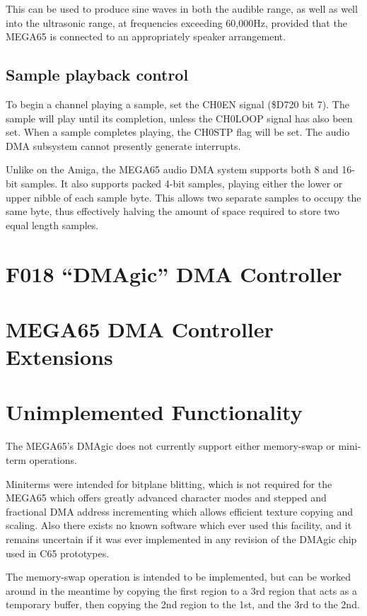 This can be used to produce sine waves in both the audible range, as
well as well into the ultrasonic range, at frequencies exceeding
60,000Hz, provided that the MEGA65 is connected to an appropriately
speaker arrangement.

\subsection{Sample playback control}

To begin a channel playing a sample, set the CH0EN signal (\$D720 bit
7). The sample will play until its completion, unless the CH0LOOP
signal has also been set. When a sample completes playing, the CH0STP
flag will be set.  The audio DMA subsystem cannot presently generate
interrupts.

Unlike on the Amiga\texttrademark{}, the MEGA65 audio DMA system supports both
8 and 16-bit samples.  It also supports packed 4-bit samples, playing
either the lower or upper nibble of each sample byte.  This allows two
separate samples to occupy the same byte, thus effectively halving the
amount of space required to store two equal length samples.

\section{F018 ``DMAgic'' DMA Controller}



\section{MEGA65 DMA Controller Extensions}



\section{Unimplemented Functionality}

The MEGA65's DMAgic does not currently support either memory-swap or
mini-term operations.

Miniterms were intended for bitplane blitting,
which is not required for the MEGA65 which offers greatly advanced
character modes and stepped and fractional DMA address incrementing
which allows efficient texture copying and scaling. Also there exists
no known software which ever used this facility, and it remains
uncertain if it was ever implemented in any revision of the DMAgic
chip used in C65 prototypes.

The memory-swap
operation is intended to be implemented, but can be worked around in
the meantime by copying the first region to a 3rd region that acts as
a temporary buffer, then copying the 2nd region to the 1st, and the
3rd to the 2nd.
